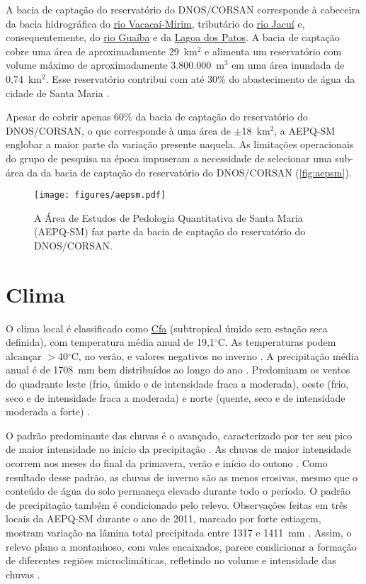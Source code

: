 A bacia de captação do reservatório do DNOS/CORSAN corresponde à cabeceira da bacia hidrográfica do \href{http://pt.wikipedia.org/wiki/Rio_Vacaca\%C3\%AD-Mirim}{rio Vacacaí-Mirim}, tributário do \href{http://pt.wikipedia.org/wiki/Rio_Jacu\%C3\%AD}{rio Jacuí} e, consequentemente, do \href{http://pt.wikipedia.org/wiki/Lago_Gua\%C3\%ADba}{rio Guaíba} e da \href{http://pt.wikipedia.org/wiki/Lagoa_dos_Patos}{Lagoa dos Patos}. A bacia de captação cobre uma área de aproximadamente 29~km$^2$ e alimenta um reservatório com volume máximo de aproximadamente 3.800.000~m$^3$ em uma área inundada de 0,74~km$^2$. Esse reservatório contribui com até 30\% do abastecimento de água da cidade de Santa Maria \cite{Dias2003, DillEtAl2004, Miguel2010}.

Apesar de cobrir apenas 60\% da bacia de captação do reservatório do DNOS/CORSAN, o que corresponde à uma área de $\pm$18~km$^2$, a AEPQ-SM englobar a maior parte da variação presente naquela. As limitações operacionais do grupo de pesquisa na época impuseram a necessidade de selecionar uma sub-área da da bacia de captação do reservatório do DNOS/CORSAN (\autoref{fig:aepsm}).

\begin{figure}[ht]
  \centering
  \texttt{[image: figures/aepsm.pdf]}
  \caption{A Área de Estudos de Pedologia Quantitativa de Santa Maria (AEPQ-SM) faz parte da bacia de captação do reservatório do DNOS/CORSAN.}
  \label{fig:aepsm}
\end{figure}

\section{Clima}

O clima local é classificado como \href{http://pt.wikipedia.org/wiki/Clima_subtropical_\%C3\%BAmido}{Cfa} (subtropical úmido sem estação seca definida), com temperatura média anual de 19,1$^\circ$C. As temperaturas podem alcançar $>$40$^\circ$C, no verão, e valores negativos no inverno \cite{HeldweinEtAl2009}. A precipitação média anual é de 1708~mm bem distribuídos ao longo do ano \cite{Maluf2000}. Predominam os ventos do quadrante leste (frio, úmido e de intensidade fraca a moderada), oeste (frio, seco e de intensidade fraca a moderada) e norte (quente, seco e de intensidade moderada a forte) \cite{HeldweinEtAl2009}.

O padrão predominante das chuvas é o avançado, caracterizado por ter seu pico de maior intensidade no início da precipitação \cite{MehlEtAl2001}. As chuvas de maior intensidade ocorrem nos meses do final da primavera, verão e início do outono \cite{MouraBueno2012}. Como resultado desse padrão, as chuvas de inverno são as menos erosivas, mesmo que o conteúdo de água do solo permaneça elevado durante todo o período. O padrão de precipitação também é condicionado pelo relevo. Observações feitas em três locais da AEPQ-SM durante o ano de 2011, marcado por forte estiagem, mostram variação na lâmina total precipitada entre 1317 e 1411~mm \cite{MouraBueno2012}. Assim, o relevo plano a montanhoso, com vales encaixados, parece condicionar a formação de diferentes regiões microclimáticas, refletindo no volume e intensidade das chuvas \cite{MouraBueno2012}.


